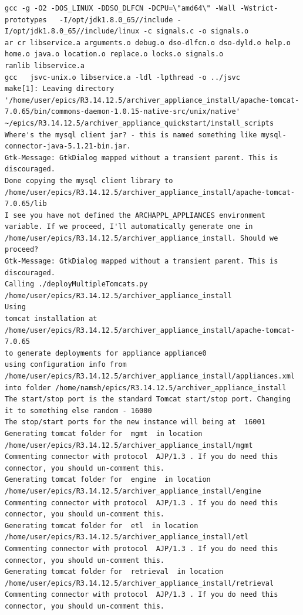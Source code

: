 \documentclass[11pt
  , a4paper
  , article
  , oneside
]{memoir}
\begin{document}
\begin{lstlisting}[style=termstyle]
gcc -g -O2 -DOS_LINUX -DDSO_DLFCN -DCPU=\"amd64\" -Wall -Wstrict-prototypes   -I/opt/jdk1.8.0_65//include -I/opt/jdk1.8.0_65//include/linux -c signals.c -o signals.o
ar cr libservice.a arguments.o debug.o dso-dlfcn.o dso-dyld.o help.o home.o java.o location.o replace.o locks.o signals.o
ranlib libservice.a
gcc   jsvc-unix.o libservice.a -ldl -lpthread -o ../jsvc
make[1]: Leaving directory '/home/user/epics/R3.14.12.5/archiver_appliance_install/apache-tomcat-7.0.65/bin/commons-daemon-1.0.15-native-src/unix/native'
~/epics/R3.14.12.5/archiver_appliance_quickstart/install_scripts
Where's the mysql client jar? - this is named something like mysql-connector-java-5.1.21-bin.jar.
Gtk-Message: GtkDialog mapped without a transient parent. This is discouraged.
Done copying the mysql client library to /home/user/epics/R3.14.12.5/archiver_appliance_install/apache-tomcat-7.0.65/lib
I see you have not defined the ARCHAPPL_APPLIANCES environment variable. If we proceed, I'll automatically generate one in /home/user/epics/R3.14.12.5/archiver_appliance_install. Should we proceed?
Gtk-Message: GtkDialog mapped without a transient parent. This is discouraged.
Calling ./deployMultipleTomcats.py /home/user/epics/R3.14.12.5/archiver_appliance_install
Using
tomcat installation at /home/user/epics/R3.14.12.5/archiver_appliance_install/apache-tomcat-7.0.65 
to generate deployments for appliance appliance0 
using configuration info from /home/user/epics/R3.14.12.5/archiver_appliance_install/appliances.xml 
into folder /home/namsh/epics/R3.14.12.5/archiver_appliance_install
The start/stop port is the standard Tomcat start/stop port. Changing it to something else random - 16000
The stop/start ports for the new instance will being at  16001
Generating tomcat folder for  mgmt  in location /home/user/epics/R3.14.12.5/archiver_appliance_install/mgmt
Commenting connector with protocol  AJP/1.3 . If you do need this connector, you should un-comment this.
Generating tomcat folder for  engine  in location /home/user/epics/R3.14.12.5/archiver_appliance_install/engine
Commenting connector with protocol  AJP/1.3 . If you do need this connector, you should un-comment this.
Generating tomcat folder for  etl  in location /home/user/epics/R3.14.12.5/archiver_appliance_install/etl
Commenting connector with protocol  AJP/1.3 . If you do need this connector, you should un-comment this.
Generating tomcat folder for  retrieval  in location /home/user/epics/R3.14.12.5/archiver_appliance_install/retrieval
Commenting connector with protocol  AJP/1.3 . If you do need this connector, you should un-comment this.

\end{lstlisting}
\end{document}
